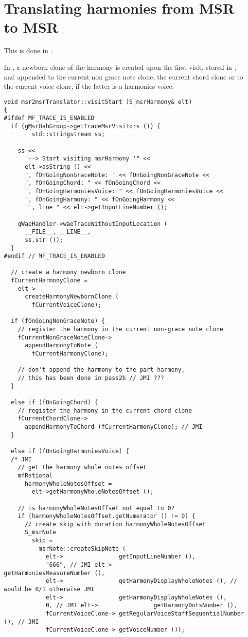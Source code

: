 \section{Translating harmonies from MSR to MSR}

This is done in \msrToMsr{}.

In , a newborn clone of the harmony is created upon the first visit, stored in , and appended to the current non grace note clone, the current chord clone or to the current voice clone, if the latter is a harmonies voice: %
\begin{lstlisting}[language=CPlusPlus]
void msr2msrTranslator::visitStart (S_msrHarmony& elt)
{
#ifdef MF_TRACE_IS_ENABLED
  if (gMsrOahGroup->getTraceMsrVisitors ()) {
		std::stringstream ss;

    ss <<
      "--> Start visiting msrHarmony '" <<
      elt->asString () <<
      ", fOnGoingNonGraceNote: " << fOnGoingNonGraceNote <<
      ", fOnGoingChord: " << fOnGoingChord <<
      ", fOnGoingHarmoniesVoice: " << fOnGoingHarmoniesVoice <<
      ", fOnGoingHarmony: " << fOnGoingHarmony <<
      "', line " << elt->getInputLineNumber ();

    gWaeHandler->waeTraceWithoutInputLocation (
      __FILE__, __LINE__,
      ss.str ());
  }
#endif // MF_TRACE_IS_ENABLED

  // create a harmony newborn clone
  fCurrentHarmonyClone =
    elt->
      createHarmonyNewbornClone (
        fCurrentVoiceClone);

  if (fOnGoingNonGraceNote) {
    // register the harmony in the current non-grace note clone
    fCurrentNonGraceNoteClone->
      appendHarmonyToNote (
        fCurrentHarmonyClone);

    // don't append the harmony to the part harmony,
    // this has been done in pass2b // JMI ???
  }

  else if (fOnGoingChord) {
    // register the harmony in the current chord clone
    fCurrentChordClone->
      appendHarmonyToChord (fCurrentHarmonyClone); // JMI
  }

  else if (fOnGoingHarmoniesVoice) {
  /* JMI
    // get the harmony whole notes offset
    mfRational
      harmonyWholeNotesOffset =
        elt->getHarmonyWholeNotesOffset ();

    // is harmonyWholeNotesOffset not equal to 0?
    if (harmonyWholeNotesOffset.getNumerator () != 0) {
      // create skip with duration harmonyWholeNotesOffset
      S_msrNote
        skip =
          msrNote::createSkipNote (
            elt->                getInputLineNumber (),
            "666", // JMI elt->                getHarmoniesMeasureNumber (),
            elt->                getHarmonyDisplayWholeNotes (), // would be 0/1 otherwise JMI
            elt->                getHarmonyDisplayWholeNotes (),
            0, // JMI elt->                getHarmonyDotsNumber (),
            fCurrentVoiceClone-> getRegularVoiceStaffSequentialNumber (), // JMI
            fCurrentVoiceClone-> getVoiceNumber ());


\end{lstlisting}
